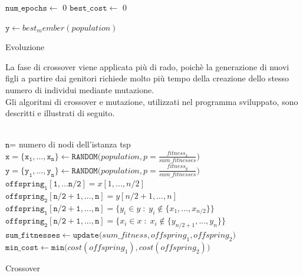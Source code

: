 \begin{algorithm}[H]
\DontPrintSemicolon
{}
\BlankLine
 $\mathtt{num\_epochs} \gets$ 0\;
 $\mathtt{best\_cost} \gets$ 0\;
 \BlankLine
 
 $\mathtt{y}\gets best_member(population)$
 \caption{Evoluzione}
\end{algorithm}
La fase di crossover viene applicata più di rado, poichè la generazione di nuovi figli a partire dai genitori richiede molto più tempo della creazione dello stesso numero di individui mediante mutazione.\\
Gli algoritmi di crossover e mutazione, utilizzati nel programma sviluppato, sono descritti e illustrati di seguito.\\\\
\begin{algorithm}[H]
\DontPrintSemicolon
{}
\BlankLine 
$\mathtt{n}$= numero di nodi dell'istanza tsp\;
$\mathtt{x=\{x_1,...,x_n\} \gets RANDOM(}population, p=\frac{fitness_x}{sum\_fitnesses})$\;
$\mathtt{y=\{y_1,...,y_n\} \gets RANDOM(}population, p=\frac{fitness_y}{sum\_fitnesses})$\;
 \BlankLine \BlankLine
 $\mathtt{offspring_1[1,...n/2]}=x[1,..., n/2]$\;
 $\mathtt{offspring_2[n/2+1,...,n]}=y[n/2+1,..., n]$\;
 $\mathtt{offspring_1[n/2+1,...,n]}=\{y_i\in y\; :\; y_i\not\in\{x_1, ..., x_{n/2}\}\}$\;
 $\mathtt{offspring_2[n/2+1,...,n]}=\{x_i\in x\; :\; x_i\not\in\{y_{n/2+1}, ..., y_{n}\}\}$\;
  \BlankLine
  $\mathtt{sum\_fitnesses\gets update(}sum\_fitness, offspring_1, offspring_2\mathtt{)}$\;
  \BlankLine  
  $\mathtt{min\_cost \gets min(}cost(offspring_1), cost(offspring_2)\mathtt{)}$\;  
  \BlankLine
\caption{Crossover}\label{crossover_pseudo}
\end{algorithm}

